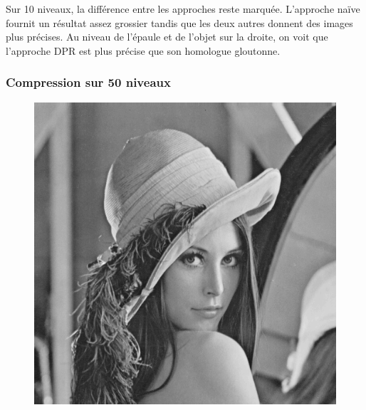 \documentclass[a4paper, 12pt]{article}
\begin{document}
    Sur 10 niveaux, la différence entre les approches reste marquée. L'approche naïve fournit un résultat assez grossier tandis que les deux autres donnent des images plus précises. Au niveau de l'épaule et de l'objet sur la droite, on voit que l'approche DPR est plus précise que son homologue gloutonne.
    \subsubsection{Compression sur 50 niveaux}
	\begin{figure}[ht!]
	    \centering
    	\begin{minipage}[b]{0.3\linewidth}
    	    \includegraphics[scale=0.3]{resources/png/naive50.png}
        \end{minipage}\hfill
        \begin{minipage}[b]{0.3\linewidth}

\end{minipage}
\end{figure}
\end{document}
